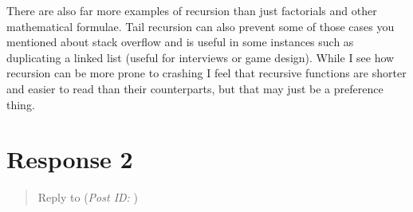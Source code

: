 \documentclass[12pt]{article}
\theoremstyle{definition}
\theoremstyle{plain}
\begin{document}
      There are also far more examples of recursion than just factorials and
        other mathematical formulae. Tail recursion can also prevent some of
        those cases you mentioned about stack overflow and is useful in some
        instances such as duplicating a linked list (useful for interviews or
        game design). While I see how recursion can be more prone to crashing
        I feel that recursive functions are shorter and easier to read than
        their counterparts, but that may just be a preference thing.

    \section{Response 2}
      \begin{quote}
        Reply to \textbf{} (\textit{Post ID: })
      \end{quote}
      

  \newpage
  \printbibliography[
    heading=bibintoc,
    title={Bibliography}
  ]
\end{document}
